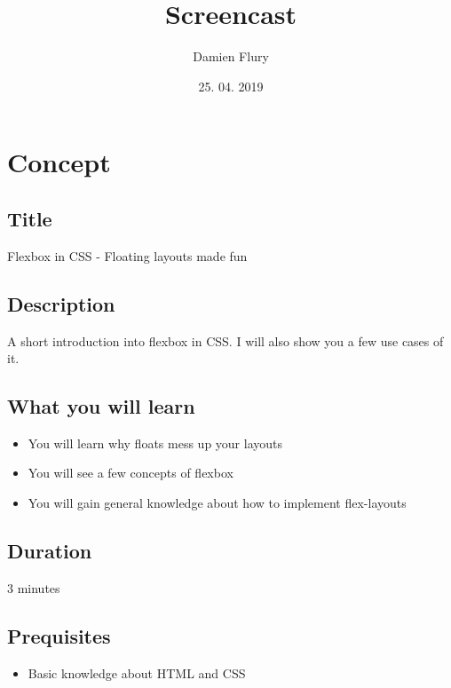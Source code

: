 \documentclass[a4paper, titlepage]{article}
\title{Screencast}
\author{Damien Flury}
\date{25. 04. 2019}
\begin{document}
    \maketitle
    \section{Concept}
    \subsection{Title}
    Flexbox in CSS - Floating layouts made fun
    \subsection{Description}
    A short introduction into flexbox in CSS. I will also show you a few
    use cases of it.
    \subsection{What you will learn}
    \begin{itemize}
        \item You will learn why floats mess up your layouts
        \item You will see a few concepts of flexbox
        \item You will gain general knowledge about how to implement flex-layouts
    \end{itemize}
    \subsection{Duration}
    3 minutes
    \subsection{Prequisites}
    \begin{itemize}
        \item Basic knowledge about HTML and CSS
    \end{itemize}
\end{document}
